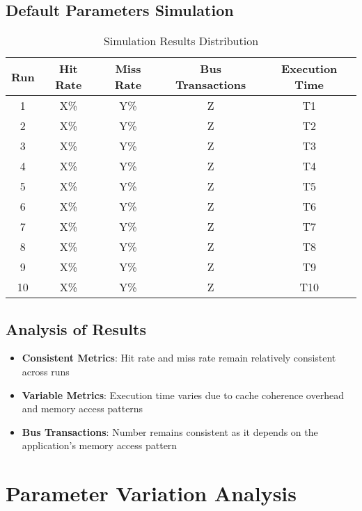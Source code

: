 \documentclass{article}
\begin{document}
\subsection{Default Parameters Simulation}
\begin{table}[H]
    \centering
    \begin{tabular}{|c|c|c|c|c|}
        \hline
        Run & Hit Rate & Miss Rate & Bus Transactions & Execution Time \\
        \hline
        1 & X\% & Y\% & Z & T1 \\
        2 & X\% & Y\% & Z & T2 \\
        3 & X\% & Y\% & Z & T3 \\
        4 & X\% & Y\% & Z & T4 \\
        5 & X\% & Y\% & Z & T5 \\
        6 & X\% & Y\% & Z & T6 \\
        7 & X\% & Y\% & Z & T7 \\
        8 & X\% & Y\% & Z & T8 \\
        9 & X\% & Y\% & Z & T9 \\
        10 & X\% & Y\% & Z & T10 \\
        \hline
    \end{tabular}
    \caption{Simulation Results Distribution}
\end{table}

\subsection{Analysis of Results}
\begin{itemize}
    \item \textbf{Consistent Metrics}: Hit rate and miss rate remain relatively consistent across runs
    \item \textbf{Variable Metrics}: Execution time varies due to cache coherence overhead and memory access patterns
    \item \textbf{Bus Transactions}: Number remains consistent as it depends on the application's memory access pattern
\end{itemize}

\section{Parameter Variation Analysis}
\end{document}
